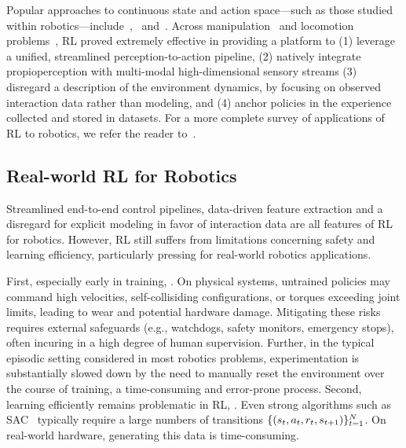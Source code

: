 Popular approaches to continuous state and action space---such as those studied within robotics---include~\citet[TRPO]{schulmanTrustRegionPolicy2017},~\citet[PPO]{ schulmanProximalPolicyOptimization2017} and~\citet[SAC]{ haarnojaSoftActorCriticOffPolicy2018}.
Across manipulation~\citep{akkayaSolvingRubiksCube2019} and locomotion problems~\citep{leeLearningQuadrupedalLocomotion2020}, RL proved extremely effective in providing a platform to (1) leverage a unified, streamlined perception-to-action pipeline, (2) natively integrate propioperception with multi-modal high-dimensional sensory streams  (3) disregard a description of the environment dynamics, by focusing on observed interaction data rather than modeling, and (4) anchor policies in the experience collected and stored in datasets.
For a more complete survey of applications of RL to robotics, we refer the reader to~\citet{koberReinforcementLearningRobotics,tangDeepReinforcementLearning2025}.

\subsection{Real-world RL for Robotics}
Streamlined end-to-end control pipelines, data-driven feature extraction and a disregard for explicit modeling in favor of interaction data are all features of RL for robotics.
However, RL still suffers from limitations concerning safety and learning efficiency, particularly pressing for real-world robotics applications.

First, especially early in training, .
On physical systems, untrained policies may command high velocities, self-collisiding configurations, or torques exceeding joint limits, leading to wear and potential hardware damage.
Mitigating these risks requires external safeguards (e.g., watchdogs, safety monitors, emergency stops), often incuring in a high degree of human supervision.
Further, in the typical episodic setting considered in most robotics problems, experimentation is substantially slowed down by the need to manually reset the environment over the course of training, a time-consuming and error-prone process.
Second, learning efficiently remains problematic in RL, .
Even strong algorithms such as SAC~\citep{haarnojaSoftActorCriticOffPolicy2018} typically require a large numbers of transitions \( \{ (s_t, a_t, r_t, s_{t+1}) \}_{t=1}^N \).
On real-world hardware, generating this data is time-consuming.

